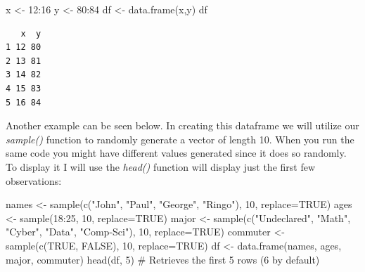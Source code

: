 \documentclass[
  letterpaper,
  DIV=11,
  numbers=noendperiod]{scrreprt}
\newenvironment{Shaded}{\begin{snugshade}}{\end{snugshade}}
\newcommand{\AttributeTok}[1]{\textcolor[rgb]{0.40,0.45,0.13}{#1}}
\newcommand{\CommentTok}[1]{\textcolor[rgb]{0.37,0.37,0.37}{#1}}
\newcommand{\ConstantTok}[1]{\textcolor[rgb]{0.56,0.35,0.01}{#1}}
\newcommand{\DecValTok}[1]{\textcolor[rgb]{0.68,0.00,0.00}{#1}}
\newcommand{\FunctionTok}[1]{\textcolor[rgb]{0.28,0.35,0.67}{#1}}
\newcommand{\NormalTok}[1]{\textcolor[rgb]{0.00,0.23,0.31}{#1}}
\newcommand{\OtherTok}[1]{\textcolor[rgb]{0.00,0.23,0.31}{#1}}
\newcommand{\SpecialCharTok}[1]{\textcolor[rgb]{0.37,0.37,0.37}{#1}}
\newcommand{\StringTok}[1]{\textcolor[rgb]{0.13,0.47,0.30}{#1}}
\begin{document}
\begin{Shaded}
\begin{Highlighting}[]
\NormalTok{x }\OtherTok{\textless{}{-}} \DecValTok{12}\SpecialCharTok{:}\DecValTok{16}
\NormalTok{y }\OtherTok{\textless{}{-}} \DecValTok{80}\SpecialCharTok{:}\DecValTok{84}
\NormalTok{df }\OtherTok{\textless{}{-}} \FunctionTok{data.frame}\NormalTok{(x,y)}
\NormalTok{df}
\end{Highlighting}
\end{Shaded}

\begin{verbatim}
   x  y
1 12 80
2 13 81
3 14 82
4 15 83
5 16 84
\end{verbatim}

Another example can be seen below. In creating this dataframe we will
utilize our \emph{sample()} function to randomly generate a vector of
length 10. When you run the same code you might have different values
generated since it does so randomly. To display it I will use the
\emph{head()} function will display just the first few observations:

\begin{Shaded}
\begin{Highlighting}[]
\NormalTok{names }\OtherTok{\textless{}{-}} \FunctionTok{sample}\NormalTok{(}\FunctionTok{c}\NormalTok{(}\StringTok{"John"}\NormalTok{, }\StringTok{"Paul"}\NormalTok{, }\StringTok{"George"}\NormalTok{, }\StringTok{"Ringo"}\NormalTok{), }\DecValTok{10}\NormalTok{, }\AttributeTok{replace=}\ConstantTok{TRUE}\NormalTok{)}
\NormalTok{ages }\OtherTok{\textless{}{-}} \FunctionTok{sample}\NormalTok{(}\DecValTok{18}\SpecialCharTok{:}\DecValTok{25}\NormalTok{, }\DecValTok{10}\NormalTok{, }\AttributeTok{replace=}\ConstantTok{TRUE}\NormalTok{)}
\NormalTok{major }\OtherTok{\textless{}{-}} \FunctionTok{sample}\NormalTok{(}\FunctionTok{c}\NormalTok{(}\StringTok{"Undeclared"}\NormalTok{, }\StringTok{"Math"}\NormalTok{, }\StringTok{"Cyber"}\NormalTok{, }\StringTok{"Data"}\NormalTok{, }\StringTok{"Comp{-}Sci"}\NormalTok{), }\DecValTok{10}\NormalTok{, }\AttributeTok{replace=}\ConstantTok{TRUE}\NormalTok{)}
\NormalTok{commuter }\OtherTok{\textless{}{-}} \FunctionTok{sample}\NormalTok{(}\FunctionTok{c}\NormalTok{(}\ConstantTok{TRUE}\NormalTok{, }\ConstantTok{FALSE}\NormalTok{), }\DecValTok{10}\NormalTok{, }\AttributeTok{replace=}\ConstantTok{TRUE}\NormalTok{)}
\NormalTok{df }\OtherTok{\textless{}{-}} \FunctionTok{data.frame}\NormalTok{(names, ages, major, commuter)}
\FunctionTok{head}\NormalTok{(df, }\DecValTok{5}\NormalTok{) }\CommentTok{\# Retrieves the first 5 rows (6 by default)}
\end{Highlighting}
\end{Shaded}
\end{document}

